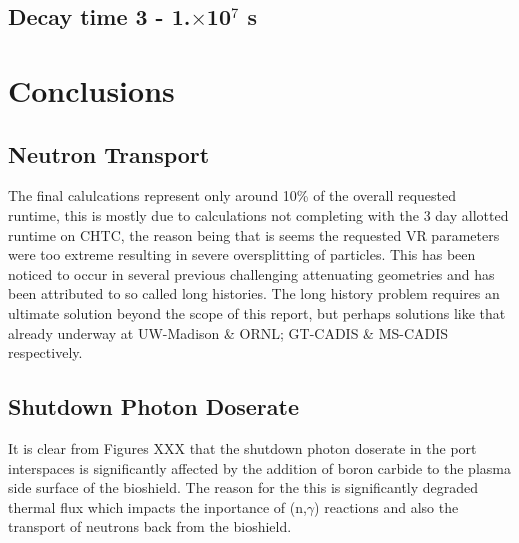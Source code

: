 \documentclass[12pt]{article}
\begin{document}
\subsection{Decay time 3 - 1.$\times$10$^7$ s}

\section{Conclusions}
\subsection{Neutron Transport}
The final calulcations represent only around 10\% of the overall requested runtime, this is mostly due to calculations not completing with the 3 day allotted runtime on CHTC, the reason being that is seems the requested VR parameters were too extreme resulting in severe oversplitting of particles. This has been noticed to occur in several previous challenging attenuating geometries and has been attributed to so called long histories. The long history problem requires an ultimate solution beyond the scope of this report, but perhaps solutions like that already underway at UW-Madison \& ORNL; GT-CADIS \& MS-CADIS respectively.
\subsection{Shutdown Photon Doserate}
It is clear from Figures XXX that the shutdown photon doserate in the port interspaces is significantly affected by the addition of boron carbide to the plasma side surface of the bioshield. The reason for the this is significantly degraded thermal flux which impacts the inportance of (n,$\gamma$) reactions and also the transport of neutrons back from the bioshield. 



\end{document}
